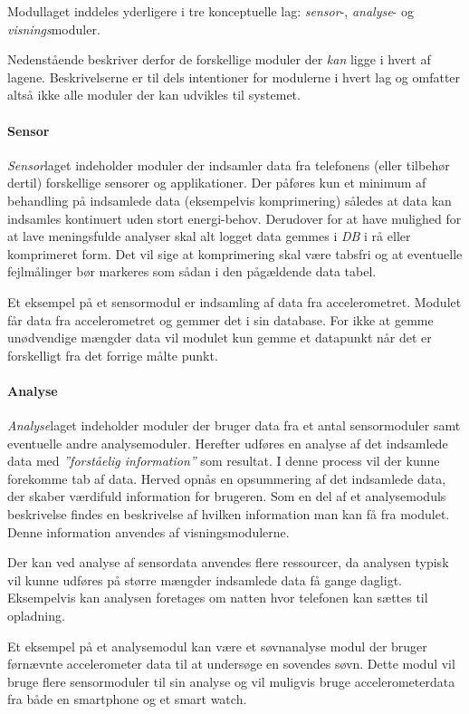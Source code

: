 Modullaget inddeles yderligere i tre konceptuelle lag: \textit{sensor}-, \textit{analyse}- og \textit{visnings}moduler.

Nedenstående beskriver derfor de forskellige moduler der \textit{kan} ligge i hvert af lagene.
Beskrivelserne er til dels intentioner for modulerne i hvert lag og omfatter altså ikke alle moduler der kan udvikles til systemet.

\paragraph{Sensor}
\textit{Sensor}laget indeholder moduler der indsamler data fra telefonens (eller tilbehør dertil) forskellige sensorer og applikationer.
Der påføres kun et minimum af behandling på indsamlede data (eksempelvis komprimering) således at data kan indsamles kontinuert uden stort energi-behov.
Derudover for at have mulighed for at lave meningsfulde analyser skal alt logget data gemmes i \textit{DB} i rå eller komprimeret form.
Det vil sige at komprimering skal være tabsfri og at eventuelle fejlmålinger bør markeres som sådan i den pågældende data tabel.

Et eksempel på et sensormodul er indsamling af data fra accelerometret.
Modulet får data fra accelerometret og gemmer det i sin database. 
For ikke at gemme unødvendige mængder data vil modulet kun gemme et datapunkt når det er forskelligt fra det forrige målte punkt.

\paragraph{Analyse}
\textit{Analyse}laget indeholder moduler der bruger data fra et antal sensormoduler samt eventuelle andre analysemoduler.
Herefter udføres en analyse af det indsamlede data med \textit{''forståelig information''} som resultat.
I denne process vil der kunne forekomme tab af data.
Herved opnås en opsummering af det indsamlede data, der skaber værdifuld information for brugeren.
Som en del af et analysemoduls beskrivelse findes en beskrivelse af hvilken information man kan få fra modulet.
Denne information anvendes af visningsmodulerne.

Der kan ved analyse af sensordata anvendes flere ressourcer, da analysen typisk vil kunne udføres på større mængder indsamlede data få gange dagligt.
Eksempelvis kan analysen foretages om natten hvor telefonen kan sættes til opladning.

Et eksempel på et analysemodul kan være et søvnanalyse modul der bruger førnævnte accelerometer data til at undersøge en sovendes søvn.
Dette modul vil bruge flere sensormoduler til sin analyse og vil muligvis bruge accelerometerdata fra både en smartphone og et smart watch.

